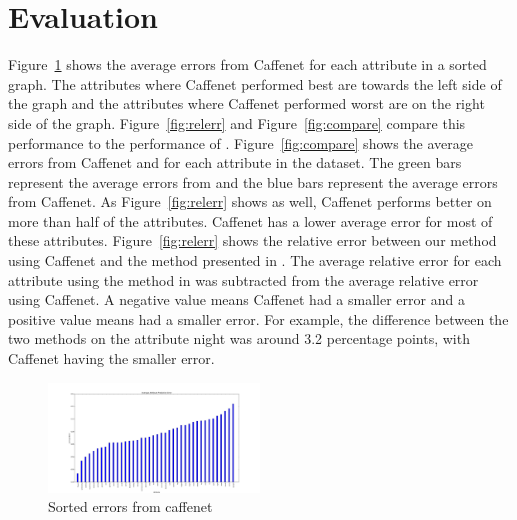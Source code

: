 \documentclass{article}
\newcommand{\figref}[1]{Figure~\ref{fig:#1}}
\begin{document}
\section{Evaluation}
\indent
\figref{sort} shows the average errors from Caffenet for each attribute
in a sorted graph.  The attributes where Caffenet performed best are towards
the left side of the graph and the attributes where Caffenet performed
worst are on the right side of the graph. \figref{relerr} and \figref{compare} 
compare this performance to the performance of \cite{Laffont14}.
\newline\indent
\figref{compare} shows the average errors from Caffenet and \cite{Laffont14}
for each attribute in the dataset.  The green bars represent the average errors
from \cite{Laffont14} and the blue bars represent the average errors from Caffenet.
As \figref{relerr} shows as well, Caffenet performs better on more than half of 
the attributes.  Caffenet has a lower average error for most of these attributes.
\newline\indent
\figref{relerr} shows the relative error between our method using Caffenet
and the method presented in \cite{Laffont14}.  The average relative error 
for each attribute using the method in \cite{Laffont14} was subtracted from
the average relative error using Caffenet.  A negative value means Caffenet
had a smaller error and a positive value means \cite{Laffont14} had a smaller
error.  For example, the difference between the two methods on the attribute
night was around 3.2 percentage points, with Caffenet having the smaller 
error. 
 
%
%
%


\begin{figure}[t]
	\centering
		\includegraphics[width=0.5\textwidth]{figs/caffenet_avg_err.png}
		\caption{Sorted errors from caffenet}\label{fig:sort}
\end{figure}
\end{document}
